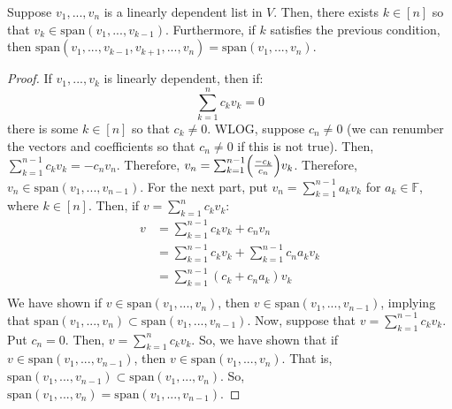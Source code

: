\documentclass{article}
\begin{document}
\begin{lemma}
  \label{lemma:linear-dependence-lemma}
  Suppose $v_1, ..., v_n$ is a linearly dependent list in $V$. Then,
  there exists $k \in [n]$ so that $v_k \in \text{span}(v_1, ...,
  v_{k - 1})$. Furthermore, if $k$ satisfies the previous condition,
  then $\text{span}(v_1, ..., v_{k-1}, v_{k+1}, ..., v_n) =
  \text{span}(v_1, ..., v_n)$.
\end{lemma}
\begin{proof}
  If $v_1, ..., v_k$ is linearly dependent, then if:
  $$\sum_{k=1}^n c_k v_k = 0$$
  there is some $k \in [n]$ so that $c_k \ne 0$. WLOG, suppose $c_n
  \ne 0$ (we can renumber the vectors and coefficients so that $c_n
  \ne 0$ if this is not true). Then, $\sum_{k=1}^{n-1} c_k v_k = -c_n
  v_n$. Therefore, $v_n = \sum_{k=1}^{n-1} \Bigl( \frac{-c_k}{c_n}
  \Bigr) v_k$. Therefore, $v_n \in \text{span}(v_1, ..., v_{n-1})$.
  For the next part, put $v_n = \sum_{k=1}^{n-1} a_k v_k$ for $a_k \in
  \mathbb{F}$, where $k \in [n]$. Then, if $v = \sum_{k=1}^n c_k v_k$:
  \begin{align*}
	v &= \sum_{k=1}^{n-1} c_k v_k + c_n v_n \\
      &= \sum_{k=1}^{n-1} c_k v_k + \sum_{k=1}^{n-1} c_n a_k v_k \\
      &= \sum_{k=1}^{n-1} (c_k + c_n a_k) v_k \\
  \end{align*}
  We have shown if $v \in \text{span}(v_1, ..., v_n)$, then $v \in
  \text{span}(v_1, ..., v_{n-1})$, implying that $\text{span}(v_1,
  ..., v_n) \subset \text{span}(v_1, ..., v_{n-1})$. Now, suppose that
  $v = \sum_{k=1}^{n-1} c_k v_k$. Put $c_n = 0$. Then, $v =
  \sum_{k=1}^{n} c_k v_k$. So, we have shown that if $v \in \text{span}(v_1,
  ..., v_{n-1})$, then $v \in \text{span}(v_1, ..., v_n)$. That is,
  $\text{span}(v_1, ..., v_{n-1}) \subset \text{span}(v_1, ...,
  v_n)$. So, $\text{span}(v_1, ..., v_n) = \text{span}(v_1, ..., v_{n-1})$.
\end{proof}
\end{document}
